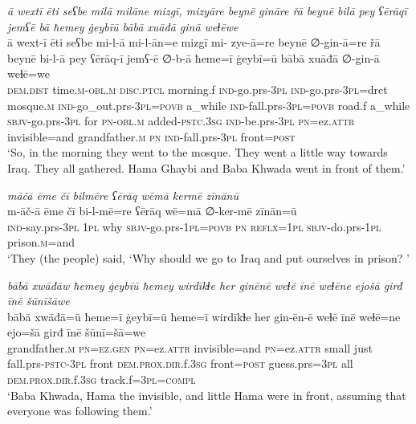 \ea \label{BP.98}
\textit{ā wextī ēti seʕbe milā milāne mizgī, mizyāre beynē gināre řā beynē bilā pey ʕērāqī jemʕē bā ħemey ġeybīū bābā xuāđā ginā weɫēwe} \\ 
\gll ā wext-ī ēti seʕbe mi-l-ā mi-l-ān=e mizgī mi- zye-ā=re beynē ∅-gin-ā=re řā beynē bi-l-ā pey ʕērāq-ī jemʕ-ē ∅-b-ā ħeme=ī ġeybī=ū bābā xuāđā ∅-gin-ā weɫē=we \\ 
 \textsc{dem.dist} time\textsc{.m}\textsc{-obl}\textsc{.m} \textsc{disc.ptcl} morning.f \textsc{ind-}go.prs\textsc{-3pl} \textsc{ind-}go.prs\textsc{-3pl}=drct mosque\textsc{.m} \textsc{ind-}go\_out.prs\textsc{-3pl}\textsc{=\textsc{povb}} a\_while \textsc{ind-}fall.prs\textsc{-3pl}\textsc{=\textsc{povb}} road.f a\_while \textsc{sbjv-}go.prs\textsc{-3pl} for \textsc{pn}\textsc{-obl}\textsc{.m} added\textsc{-pstc}\textsc{.3sg} \textsc{ind-}be.prs\textsc{-3pl} \textsc{pn}=ez.\textsc{attr} invisible=and grandfather\textsc{.m} \textsc{pn} \textsc{ind-}fall.prs\textsc{-3pl} front\textsc{=\textsc{post}} \\ 
\glt `So, in the morning they went to the mosque. They went a little way towards Iraq. They all gathered. Hama Ghaybi and Baba Khwada went in front of them.'
\z 
 
\ea \label{BP.101}
\textit{māčā ēme čī bilmēre ʕērāq wēmā kermē zīnānū} \\ 
\gll m-āč-ā ēme čī bi-l-mē=re ʕērāq wē=mā ∅-ker-mē zīnān=ū \\ 
 \textsc{ind-}say.prs\textsc{-3pl} \textsc{1pl} why \textsc{sbjv-}go.prs\textsc{-\textsc{1pl}}\textsc{=\textsc{povb}} \textsc{pn} \textsc{reflx}\textsc{=\textsc{1pl}} \textsc{sbjv-}do.prs\textsc{-\textsc{1pl}} prison\textsc{.m}=and \\ 
\glt `They (the people) said, ‘Why should we go to Iraq and put ourselves in   prison? '
\z 
 
\ea \label{BP.105}
\textit{bābā xwāđāw ħemey ġeybīū ħemey wirdīkɫe her ginēnē weɫē īnē weɫēne ejošā girđ īnē šūnīšāwe} \\ 
\gll bābā xwāđā=ū ħeme=ī ġeybī=ū ħeme=ī wirdīkɫe her gin-ēn-ē weɫē īnē weɫē=ne ejo=šā girđ īnē šūnī=šā=we \\ 
 grandfather\textsc{.m} \textsc{pn}\textsc{=ez.gen} \textsc{pn}=ez.\textsc{attr} invisible=and \textsc{pn}=ez.\textsc{attr} small just fall.prs\textsc{-pstc}\textsc{-3pl} front \textsc{dem.prox}\textsc{.dir}.f\textsc{.3sg} front\textsc{=\textsc{post}} guess.prs\textsc{=3pl} all \textsc{dem.prox}\textsc{.dir}.f\textsc{.3sg} track.f\textsc{=3pl}\textsc{=compl} \\ 
\glt `Baba Khwada, Hama the invisible, and little Hama were in front, assuming that everyone was following them.'
\z 
 
